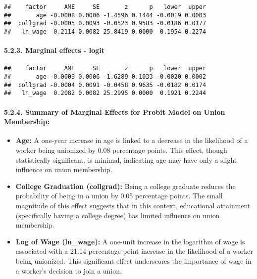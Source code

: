\documentclass[
]{article}
\begin{document}
\begin{verbatim}
##    factor     AME     SE       z      p   lower  upper
##       age -0.0008 0.0006 -1.4596 0.1444 -0.0019 0.0003
##  collgrad -0.0005 0.0093 -0.0523 0.9583 -0.0186 0.0177
##   ln_wage  0.2114 0.0082 25.8419 0.0000  0.1954 0.2274
\end{verbatim}

\hypertarget{marginal-effects---logit}{%
\paragraph{5.2.3. Marginal effects -
logit}\label{marginal-effects---logit}}

\begin{verbatim}
##    factor     AME     SE       z      p   lower  upper
##       age -0.0009 0.0006 -1.6289 0.1033 -0.0020 0.0002
##  collgrad -0.0004 0.0091 -0.0458 0.9635 -0.0182 0.0174
##   ln_wage  0.2082 0.0082 25.2995 0.0000  0.1921 0.2244
\end{verbatim}

\hypertarget{summary-of-marginal-effects-for-probit-model-on-union-membership}{%
\paragraph{5.2.4. Summary of Marginal Effects for Probit Model on Union
Membership:}\label{summary-of-marginal-effects-for-probit-model-on-union-membership}}

\begin{itemize}
\item
  \textbf{Age:} A one-year increase in age is linked to a decrease in
  the likelihood of a worker being unionized by 0.08 percentage points.
  This effect, though statistically significant, is minimal, indicating
  age may have only a slight influence on union membership.
\item
  \textbf{College Graduation (collgrad):} Being a college graduate
  reduces the probability of being in a union by 0.05 percentage points.
  The small magnitude of this effect suggests that in this context,
  educational attainment (specifically having a college degree) has
  limited influence on union membership.
\item
  \textbf{Log of Wage (ln\_wage):} A one-unit increase in the logarithm
  of wage is associated with a 21.14 percentage point increase in the
  likelihood of a worker being unionized. This significant effect
  underscores the importance of wage in a worker's decision to join a
  union.
\end{itemize}
\end{document}
